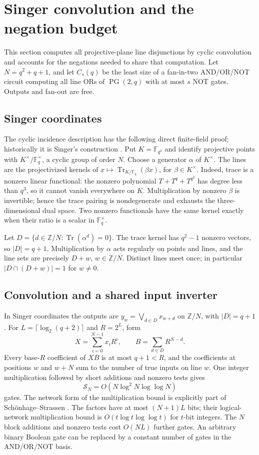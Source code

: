 \section{Singer convolution and the negation budget}
This section computes all projective-plane line disjunctions by cyclic
convolution and accounts for the negations needed to share that computation.
Let $N=q^2+q+1$, and let $C_s(q)$ be the least size of a fan-in-two
AND/OR/NOT circuit computing all line ORs of $\operatorname{PG}(2,q)$
with at most $s$ NOT gates. Outputs and fan-out are free.

\subsection{Singer coordinates}
The cyclic incidence description has the following direct finite-field
proof; historically it is Singer's construction \cite{Singer1938}.
Put $K=\mathbb F_{q^3}$ and identify projective points with
$K^\times/\mathbb F_q^\times$, a cyclic group of order $N$.
Choose a generator $\alpha$ of $K^\times$.
The lines are the projectivized kernels of
$x\mapsto\operatorname{Tr}_{K/\mathbb F_q}(\beta x)$, for
$\beta\in K^\times$. Indeed, trace is a nonzero linear functional:
the nonzero polynomial $T+T^q+T^{q^2}$ has degree less than $q^3$,
so it cannot vanish everywhere on $K$. Multiplication by nonzero
$\beta$ is invertible; hence the trace pairing is nondegenerate and
exhausts the three-dimensional dual space.
Two nonzero functionals have the same kernel exactly when their
ratio is a scalar in $\mathbb F_q^\times$.

Let $D=\{d\in\mathbb Z/N:\operatorname{Tr}(\alpha^d)=0\}$.
The trace kernel has $q^2-1$ nonzero vectors, so $|D|=q+1$.
Multiplication by $\alpha$ acts regularly on points and lines,
and the line sets are precisely $D+w$, $w\in\mathbb Z/N$.
Distinct lines meet once; in particular
$|D\cap(D+w)|=1$ for $w\ne0$.

\subsection{Convolution and a shared input inverter}

In Singer coordinates the outputs are
$y_w=\bigvee_{d\in D}x_{w+d}$ on $\mathbb Z/N$, with $|D|=q+1$.
For $L=\lceil\log_2(q+2)\rceil$ and $R=2^L$, form
\[
 X=\sum_{i=0}^{N-1}x_iR^i,\qquad B=\sum_{d\in D}R^{N-d}.
\]
Every base-$R$ coefficient of $XB$ is at most $q+1<R$, and the
coefficients at positions $w$ and $w+N$ sum to the number of true
inputs on line $w$. One integer multiplication followed by short
additions and nonzero tests gives
\[
 \mathcal S_N=O(N\log^2N\log\log N)
\]
gates. The network form of the multiplication bound is explicitly
part of Sch\"onhage--Strassen \cite[Summary]{SchonhageStrassen1971}.
The factors have at most $(N+1)L$ bits; their logical-network
multiplication bound is $O(t\log t\log\log t)$ for $t$-bit integers.
The $N$ block additions and nonzero tests cost $O(NL)$ further
gates. An arbitrary binary Boolean gate can be replaced by a
constant number of gates in the AND/OR/NOT basis.

